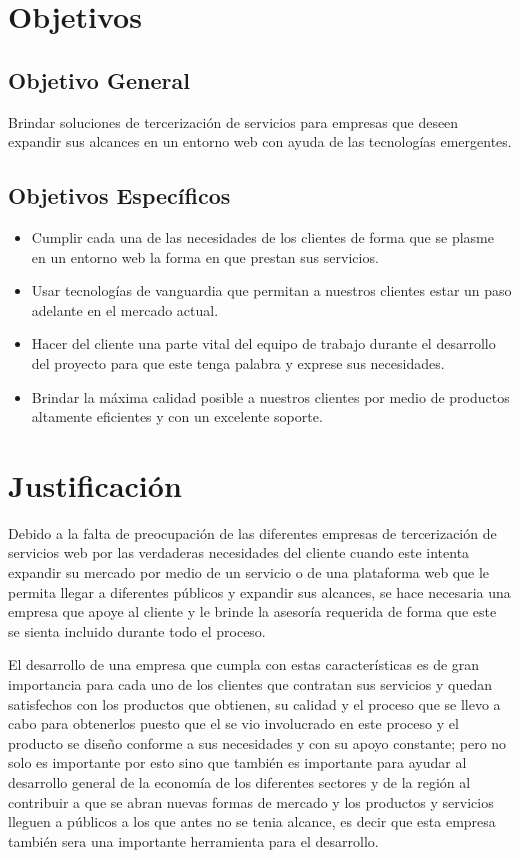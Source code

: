 \newpage

\section{Objetivos}

\subsection{Objetivo General}

Brindar soluciones de tercerización de servicios para empresas que deseen expandir sus alcances en un entorno web con ayuda de las tecnologías emergentes.


\subsection{Objetivos Específicos}
\begin{itemize}
	\item Cumplir cada una de las necesidades de los clientes de forma que se plasme en un entorno web la forma en que prestan sus servicios.
	\item Usar tecnologías de vanguardia que permitan a nuestros clientes estar un paso adelante en el mercado actual. 
	\item Hacer del cliente una parte vital del equipo de trabajo durante el desarrollo del proyecto para que este tenga palabra y exprese sus necesidades.
	\item Brindar la máxima calidad posible a nuestros clientes por medio de productos altamente eficientes y con un excelente soporte.
\end{itemize}

\section{Justificación}

Debido a la falta de preocupación de las diferentes empresas de tercerización de servicios web por las verdaderas necesidades del cliente cuando este intenta expandir su mercado por medio de un servicio o de una plataforma web que le permita llegar a diferentes públicos y expandir sus alcances, se hace necesaria una empresa que apoye al cliente y le brinde la asesoría requerida de forma que este se sienta incluido durante todo el proceso.
\newline

El desarrollo de una empresa que cumpla con estas características es de gran importancia para cada uno de los clientes que contratan sus servicios y quedan satisfechos con los productos que obtienen, su calidad y el proceso que se llevo a cabo para obtenerlos puesto que el se vio involucrado en este proceso y el producto se diseño conforme a sus necesidades y con su apoyo constante; pero no solo es importante por esto sino que también es importante para ayudar al desarrollo general de la economía de los diferentes sectores y de la región al contribuir a que se abran nuevas formas de mercado y los productos y servicios lleguen a públicos a los que antes no se tenia alcance, es decir que esta empresa también sera una importante herramienta para el desarrollo. 

